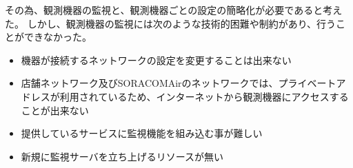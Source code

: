 その為、観測機器の監視と、観測機器ごとの設定の簡略化が必要であると考えた。
しかし、観測機器の監視には次のような技術的困難や制約があり、行うことができなかった。
\begin{itemize}
\item 機器が接続するネットワークの設定を変更することは出来ない
\item 店舗ネットワーク及びSORACOMAirのネットワークでは、プライベートアドレスが利用されているため、インターネットから観測機器にアクセスすることが出来ない
\item 提供しているサービスに監視機能を組み込む事が難しい
\item 新規に監視サーバを立ち上げるリソースが無い
\end{itemize}

